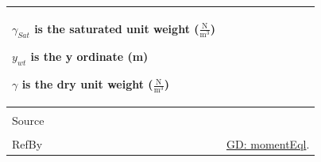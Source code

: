 \documentclass[12pt]{article}
\begin{document}
\begin{minipage}{\textwidth}
\begin{tabular}{p{} p{}}
\begin{symbDescription}
                                                  \item{${γ_{Sat}}$ is the saturated unit weight ($\frac{\text{N}}{\text{m}^{3}}$)}
                                                  \item{${y_{wt}}$ is the y ordinate (m)}
                                                  \item{$γ$ is the dry unit weight ($\frac{\text{N}}{\text{m}^{3}}$)}
                                                  \end{symbDescription}
                                                  \\ \midrule \\
                                                  Source & \cite{fredlund1977}
                                                           \\ \midrule \\
                                                           RefBy & \hyperref[GD:momentEql]{GD: momentEql}.
\\ \bottomrule \end{tabular}
\end{minipage}\\
~\newline
\end{document}
